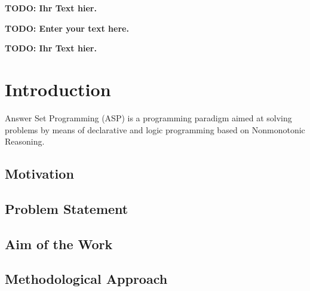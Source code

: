 \documentclass{vutinfth} %
\newcommand{\todo}[1]{{\color{red}\textbf{TODO: {#1}}}} %
\theoremstyle{example}
\theoremstyle{definition}
\theoremstyle{theorem}
\theoremstyle{lemma}
\theoremstyle{corollary}
\begin{document}
\frontmatter %

\addstatementpage

\begin{danksagung*}
\todo{Ihr Text hier.}
\end{danksagung*}

\begin{acknowledgements*}
\todo{Enter your text here.}
\end{acknowledgements*}

\begin{kurzfassung}
\todo{Ihr Text hier.}
\end{kurzfassung}

\begin{abstract}
\todo{Enter your text here.}
\end{abstract}


\tableofcontents %

\mainmatter

\chapter{Introduction}

Answer Set Programming (ASP) is a programming paradigm aimed at solving problems by means of declarative and logic programming based on Nonmonotonic Reasoning. 

\section{Motivation}

\section{Problem Statement}

\section{Aim of the Work}

\section{Methodological Approach}
\end{document}
